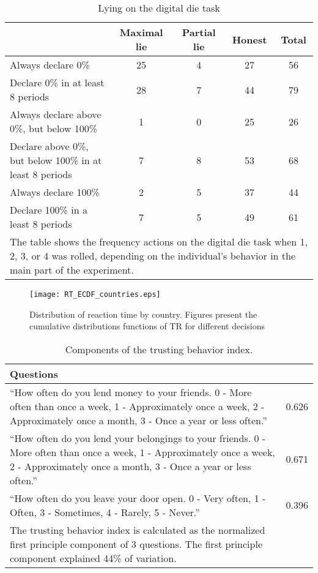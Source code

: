 \documentclass[12pt]{article}
\begin{document}
\begin{table}[h!]
\begin{center}
\begin{tabular}{lcccc}
\hline\hline
  &Maximal lie&Partial lie &Honest&Total  \\
  \hline\hline
Always declare 0\% & 25 & 4 & 27 & 56 \\
Declare 0\% in at least 8 periods & 28 & 7 & 44 & 79   \\
  \hline\hline
Always declare above 0\%, but below 100\% & 1 & 0 & 25 & 26   \\
Declare above 0\%, but below 100\% in at least 8 periods & 7 & 8 & 53 & 68 \\
  \hline\hline
Always declare 100\% & 2 & 5 & 37 & 44 \\
Declare 100\% in a least 8 periods & 7 & 5 & 49 & 61 \\
                  \hline\hline
\multicolumn{5}{p{15cm}}{\tiny The table shows the frequency actions on the digital die task when 1, 2, 3, or 4 was rolled, depending on the individual's behavior in the main part of the experiment. }
\end{tabular}
\end{center}
\caption{Lying on the digital die task}\label{tab:digdie}

\end{table}


\begin{figure}
\begin{center}
	\texttt{[image: RT\_ECDF\_countries.eps]}
	
\end{center}	
	\caption{Distribution of reaction time by country. Figures present the cumulative distributions functions of TR for different decisions}
	\label{fig:response_country}
\end{figure}


\clearpage
\begin{table}[ht]
\begin{tabular}{p{15cm}c}
\hline \hline
Questions &  \\
\hline
``How often do you lend money to your friends. 0 - More often than once a week, 1 - Approximately once a week, 2 - Approximately once a month, 3 - Once a year or less often.''&0.626\\
``How often do you lend your belongings to your friends. 0 - More often than once a week, 1 - Approximately once a week, 2 - Approximately once a month, 3 - Once a year or less often.''&0.671\\
``How often do you leave your door open. 0 - Very often, 1 - Often, 3 - Sometimes, 4 - Rarely, 5 - Never.''&0.396\\
\hline \hline 
\footnotesize{The trusting behavior index is calculated as the normalized first principle component of 3 questions. The first principle component explained 44\% of variation.}

\end{tabular}
\caption{Components of the trusting behavior index. }
\label{tab:trust}
\end{table}
\end{document}
